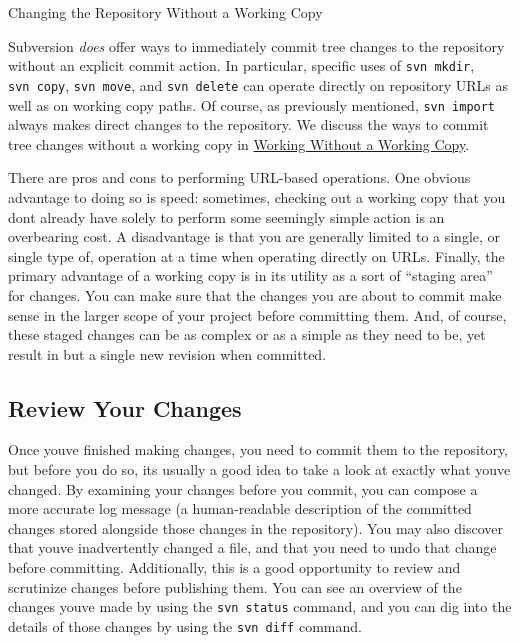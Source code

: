 Changing the Repository Without a Working Copy

Subversion \emph{does} offer ways to immediately commit tree changes to
the repository without an explicit commit action. In particular,
specific uses of \texttt{svn\ mkdir}, \texttt{svn\ copy},
\texttt{svn\ move}, and \texttt{svn\ delete} can operate directly on
repository URLs as well as on working copy paths. Of course, as
previously mentioned, \texttt{svn\ import} always makes direct changes
to the repository. We discuss the ways to commit tree changes without a
working copy in \hyperref[svn.advanced.working-without-a-wc]{Working
Without a Working Copy}.

There are pros and cons to performing URL-based operations. One obvious
advantage to doing so is speed: sometimes, checking out a working copy
that you don\textquotesingle t already have solely to perform some
seemingly simple action is an overbearing cost. A disadvantage is that
you are generally limited to a single, or single type of, operation at a
time when operating directly on URLs. Finally, the primary advantage of
a working copy is in its utility as a sort of ``staging area'' for
changes. You can make sure that the changes you are about to commit make
sense in the larger scope of your project before committing them. And,
of course, these staged changes can be as complex or as a simple as they
need to be, yet result in but a single new revision when committed.

\subsection{Review Your Changes}\label{svn.tour.cycle.examine}

Once you\textquotesingle ve finished making changes, you need to commit
them to the repository, but before you do so, it\textquotesingle s
usually a good idea to take a look at exactly what
you\textquotesingle ve changed. By examining your changes before you
commit, you can compose a more accurate log message (a human-readable
description of the committed changes stored alongside those changes in
the repository). You may also discover that you\textquotesingle ve
inadvertently changed a file, and that you need to undo that change
before committing. Additionally, this is a good opportunity to review
and scrutinize changes before publishing them. You can see an overview
of the changes you\textquotesingle ve made by using the
\texttt{svn\ status} command, and you can dig into the details of those
changes by using the \texttt{svn\ diff} command.

